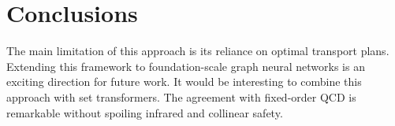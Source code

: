 \section{Conclusions}\label{sec:conclusions}

The main limitation of this approach is its reliance on optimal
transport plans. Extending this framework to foundation-scale graph
neural networks is an exciting direction for future work. It would be
interesting to combine this approach with set transformers. The
agreement with fixed-order QCD is remarkable without spoiling infrared
and collinear safety.

